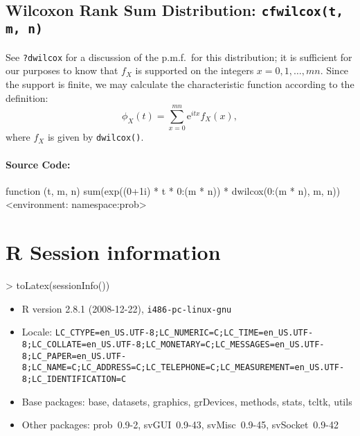 \documentclass[english]{article}
\newcommand{\me}{\mathrm{e}}
\begin{document}
\subsection{Wilcoxon Rank Sum Distribution: \texttt{cfwilcox(t, m, n)}}

See \texttt{?dwilcox} for a discussion of the p.m.f.~for this distribution;
it is sufficient for our purposes to know that $f_{X}$ is supported
on the integers $x=0,1,\ldots,mn$. Since the support is finite, we
may calculate the characteristic function according to the definition:\[
\phi_{X}(t)=\sum_{x=0}^{mn}\me^{itx}f_{X}(x),\]
where $f_{X}$ is given by \texttt{dwilcox()}.


\paragraph*{Source Code:}

\begin{Schunk}
\begin{Soutput}
function (t, m, n) 
{
    sum(exp((0+1i) * t * 0:(m * n)) * dwilcox(0:(m * n), m, n))
}
<environment: namespace:prob>
\end{Soutput}
\end{Schunk}


\section{\textsf{R} Session information}

\begin{Schunk}
\begin{Sinput}
> toLatex(sessionInfo())
\end{Sinput}
\begin{itemize}
  \item R version 2.8.1 (2008-12-22), \verb|i486-pc-linux-gnu|
  \item Locale: \verb|LC_CTYPE=en_US.UTF-8;LC_NUMERIC=C;LC_TIME=en_US.UTF-8;LC_COLLATE=en_US.UTF-8;LC_MONETARY=C;LC_MESSAGES=en_US.UTF-8;LC_PAPER=en_US.UTF-8;LC_NAME=C;LC_ADDRESS=C;LC_TELEPHONE=C;LC_MEASUREMENT=en_US.UTF-8;LC_IDENTIFICATION=C|
  \item Base packages: base, datasets, graphics, grDevices, methods,
    stats, tcltk, utils
  \item Other packages: prob~0.9-2, svGUI~0.9-43, svMisc~0.9-45,
    svSocket~0.9-42
\end{itemize}\end{Schunk}
\end{document}
